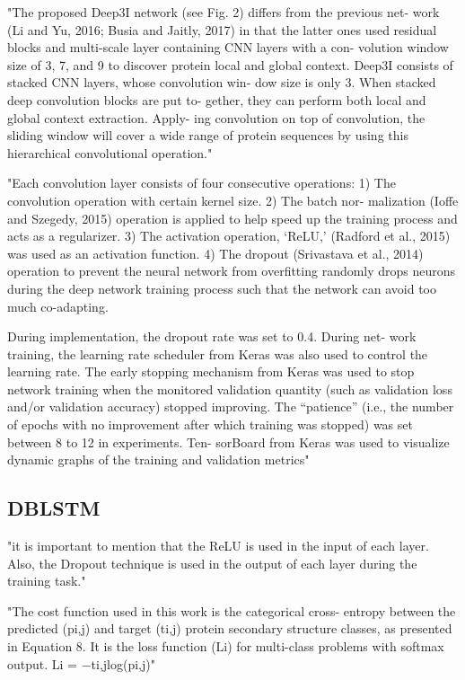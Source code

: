 \documentclass[]{scrartcl}
\begin{document}
"The proposed Deep3I network (see Fig. 2) differs from the previous net- work (Li and Yu, 2016; Busia and Jaitly, 2017) in that the latter ones used residual blocks and multi-scale layer containing CNN layers with a con- volution window size of 3, 7, and 9 to discover protein local and global context. Deep3I consists of stacked CNN layers, whose convolution win- dow size is only 3. When stacked deep convolution blocks are put to- gether, they can perform both local and global context extraction. Apply- ing convolution on top of convolution, the sliding window will cover a wide range of protein sequences by using this hierarchical convolutional operation." \cite{Fang2017}

"Each convolution layer consists of four consecutive operations: 1) The convolution operation with certain kernel size. 2) The batch nor- malization (Ioffe and Szegedy, 2015) operation is applied to help speed up
the training process and acts as a regularizer. 3) The activation operation, ‘ReLU,’ (Radford et al., 2015) was used as an activation function. 4) The dropout (Srivastava et al., 2014) operation to prevent the neural network from overfitting randomly drops neurons during the deep network training process such that the network can avoid too much co-adapting.

During implementation, the dropout rate was set to 0.4. During net-
work training, the learning rate scheduler from Keras was also used to control the learning rate. The early stopping mechanism from Keras was used to stop network training when the monitored validation quantity (such as validation loss and/or validation accuracy) stopped improving. The “patience” (i.e., the number of epochs with no improvement after which training was stopped) was set between 8 to 12 in experiments. Ten- sorBoard from Keras was used to visualize dynamic graphs of the training and validation metrics" \cite{Fang2017}

\subsection{DBLSTM}
"it is important to mention that the ReLU is used in
the input of each layer. Also, the Dropout technique is used in the output of each layer during the training task." \cite{Hattori2017}

"The cost function used in this work is the categorical cross-
entropy between the predicted (pi,j) and target (ti,j) protein secondary structure classes, as presented in Equation 8. It is the loss function (Li) for multi-class problems with softmax output.
Li = −ti,jlog(pi,j)" \cite{Hattori2017}
\end{document}
